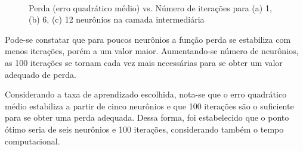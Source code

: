 \documentclass[brazil,tf,epusp]{usp}  %
\begin{document}
\begin{figure}[!h]
\hfill
{}\\
\caption{Perda (erro quadrático médio) vs. Número de iterações para (a) 1, (b) 6, (c) 12 neurônios na camada intermediária}
\label{fig:loss_NN}
\end{figure}

Pode-se constatar que para poucos neurônios a função perda se estabiliza com menos iterações, porém a um valor maior. Aumentando-se número de neurônios, as 100 iterações se tornam cada vez mais necessárias para se obter um valor adequado de perda.

Considerando a taxa de aprendizado escolhida, nota-se que o erro quadrático médio estabiliza a partir de cinco neurônios e que 100 iterações são o suficiente para se obter uma perda adequada. Dessa forma, foi estabelecido que o ponto ótimo seria de seis neurônios e 100 iterações, considerando também o tempo computacional.
\end{document}
